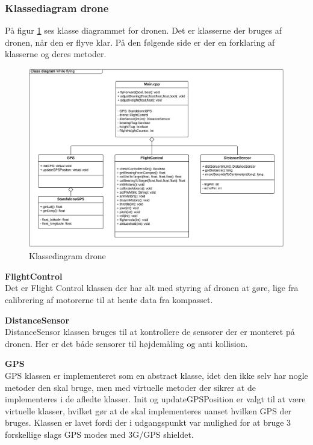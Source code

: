 \newpage
\subsubsection*{Klassediagram drone}

På figur \ref{fig:classDiagram_drone_underflyvning} ses klasse diagrammet for dronen. Det er klasserne der bruges af dronen, når den er flyve klar. På den følgende side er der en forklaring af klasserne og deres metoder. 

\begin{figure}[H]
	\centering
	\includegraphics[width=1\textwidth]{Billeder/klasse_diagrammer/classdiagram_iteration2_fly.png}
	\vspace{0cm}
	\caption{Klassediagram drone}
	\label{fig:classDiagram_drone_underflyvning}
\end{figure}

\textbf{FlightControl} \\
Det er Flight Control klassen der har alt med styring af dronen at gøre, lige fra calibrering af motorerne til at hente data fra kompasset. 

\textbf{DistanceSensor} \\
DistanceSensor klassen bruges til at kontrollere de sensorer der er monteret på dronen. Her er det både sensorer til højdemåling og anti kollision. 

\textbf{GPS} \\
GPS klassen er implementeret som en abstract klasse, idet den ikke selv har nogle metoder den skal bruge, men med virtuelle metoder der sikrer at de implementeres i de afledte klasser. 
Init og updateGPSPosition er valgt til at være virtuelle klasser, hvilket gør at de skal implementeres uanset hvilken GPS der bruges. Klassen er lavet fordi der i udgangspunkt var mulighed for at bruge 3 forskellige slags GPS modes med 3G/GPS shieldet. 

